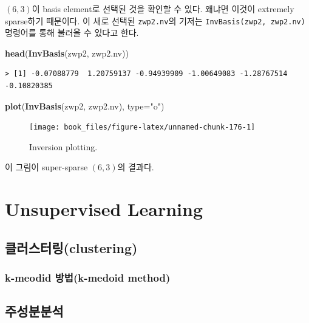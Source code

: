 \documentclass[b5paper,]{scrbook}
\makeatletter
\newenvironment{Shaded}{\begin{snugshade}}{\end{snugshade}}
\newcommand{\KeywordTok}[1]{\textcolor[rgb]{0.13,0.29,0.53}{\textbf{{#1}}}}
\newcommand{\DataTypeTok}[1]{\textcolor[rgb]{0.13,0.29,0.53}{{#1}}}
\newcommand{\StringTok}[1]{\textcolor[rgb]{0.31,0.60,0.02}{{#1}}}
\newcommand{\NormalTok}[1]{{#1}}
\theoremstyle{plain}
\theoremstyle{definition}
\numberwithin{equation}{section}
\newenvironment{kframe}{%
\medskip{}
\setlength{\fboxsep}{.8em}
 \def\at@end@of@kframe{}%
 \ifinner\ifhmode%
  \def\at@end@of@kframe{\end{minipage}}%
  \begin{minipage}{\columnwidth}%
 \fi\fi%
 \def\FrameCommand##1{\hskip\@totalleftmargin \hskip-\fboxsep
 \colorbox{shadecolor}{##1}\hskip-\fboxsep
     \hskip-\linewidth \hskip-\@totalleftmargin \hskip\columnwidth}%
 \MakeFramed {\advance\hsize-\width
   \@totalleftmargin\z@ \linewidth\hsize
   \@setminipage}}%
 {\par\unskip\endMakeFramed%
 \at@end@of@kframe}
\renewenvironment{Shaded}{\begin{kframe}}{\end{kframe}}
\makeatother
\begin{document}
\((6,3)\)이 basis element로 선택된 것을 확인할 수 있다. 왜냐면 이것이
extremely sparse하기 때문이다. 이 새로 선택된 \texttt{zwp2.nv}의 기저는
\texttt{InvBasis(zwp2,\ zwp2.nv)} 명령어를 통해 불러올 수 있다고 한다.

\begin{Shaded}
\begin{Highlighting}[]
\KeywordTok{head}\NormalTok{(}\KeywordTok{InvBasis}\NormalTok{(zwp2, zwp2.nv))}
\end{Highlighting}
\end{Shaded}

\begin{verbatim}
> [1] -0.07088779  1.20759137 -0.94939909 -1.00649083 -1.28767514 -0.10820385
\end{verbatim}

\begin{Shaded}
\begin{Highlighting}[]
\KeywordTok{plot}\NormalTok{(}\KeywordTok{InvBasis}\NormalTok{(zwp2, zwp2.nv), }\DataTypeTok{type=}\StringTok{"o"}\NormalTok{)}
\end{Highlighting}
\end{Shaded}

\begin{figure}

{\centering \texttt{[image: book\_files/figure-latex/unnamed-chunk-176-1]} 

}

\caption{Inversion plotting.}\label{fig:unnamed-chunk-176}
\end{figure}

이 그림이 super-sparse \((6,3)\)의 결과다.

\part{Unsupervised
Learning}\label{part-unsupervised-learning}

\chapter{클러스터링(clustering)}\label{clustering}

\section{k-meodid 방법(k-medoid method)}\label{k-meodid-k-medoid-method}

\chapter{주성분분석}\label{PCA}
\end{document}
